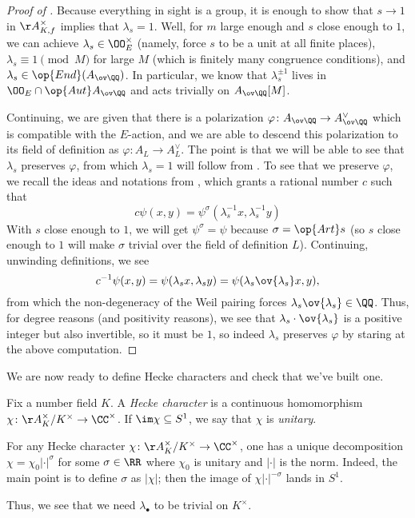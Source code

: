 \documentclass[../notes.tex]{subfiles}
\begin{document}
\begin{proof}[Proof of ]
	Because everything in sight is a group, it is enough to show that $s\to1$ in $\AA_{K,f}^\times$ implies that $\lambda_s=1$. Well, for $m$ large enough and $s$ close enough to $1$, we can achieve $\lambda_s\in\OO_E^\times$ (namely, force $s$ to be a unit at all finite places), $\lambda_s\equiv1\pmod M$ for large $M$ (which is finitely many congruence conditions), and $\lambda_s\in\op{End}(A_{\ov\QQ})$. In particular, we know that $\lambda_s^{\pm1}$ lives in $\OO_E\cap\op{Aut}A_{\ov\QQ}$ and acts trivially on $A_{\ov\QQ}[M]$.

	Continuing, we are given that there is a polarization $\varphi\colon A_{\ov\QQ}\to A_{\ov\QQ}^\lor$ which is compatible with the $E$-action, and we are able to descend this polarization to its field of definition as $\varphi\colon A_L\to A_L^\lor$. The point is that we will be able to see that $\lambda_s$ preserves $\varphi$, from which $\lambda_s=1$ will follow from . To see that we preserve $\varphi$, we recall the ideas and notations from , which grants a rational number $c$ such that
	\[c\psi(x,y)=\psi^\sigma\left(\lambda_s^{-1}x,\lambda_s^{-1}y\right)\]
	With $s$ close enough to $1$, we will get $\psi^\sigma=\psi$ because $\sigma=\op{Art}s$ (so $s$ close enough to $1$ will make $\sigma$ trivial over the field of definition $L$). Continuing, unwinding definitions, we see
	\[c^{-1}\psi(x,y)=\psi(\lambda_sx,\lambda_sy)=\psi(\lambda_s\ov{\lambda_s}x,y),\]
	from which the non-degeneracy of the Weil pairing forces $\lambda_s\ov{\lambda_s}\in\QQ$. Thus, for degree reasons (and positivity reasons), we see that $\lambda_s\cdot\ov{\lambda_s}$ is a positive integer but also invertible, so it must be $1$, so indeed $\lambda_s$ preserves $\varphi$ by staring at the above computation.
\end{proof}
We are now ready to define Hecke characters and check that we've built one.
\begin{definition}
	Fix a number field $K$. A \textit{Hecke character} is a continuous homomorphism $\chi\colon\AA_K^\times/K^\times\to\CC^\times$. If $\im\chi\subseteq S^1$, we say that $\chi$ is \textit{unitary}.
\end{definition}
\begin{remark}
	For any Hecke character $\chi\colon\AA_K^\times/K^\times\to\CC^\times$, one has a unique decomposition $\chi=\chi_0\left|\cdot\right|^\sigma$ for some $\sigma\in\RR$ where $\chi_0$ is unitary and $\left|\cdot\right|$ is the norm. Indeed, the main point is to define $\sigma$ as $\left|\chi\right|$; then the image of $\chi\left|\cdot\right|^{-\sigma}$ lands in $S^1$.
\end{remark}
Thus, we see that we need $\lambda_\bullet$ to be trivial on $K^\times$.
\end{document}
